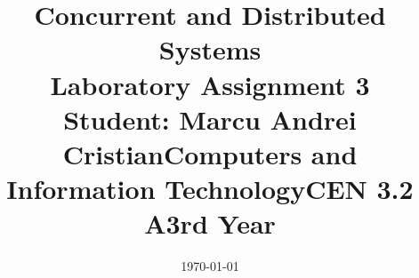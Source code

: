 \documentclass[14pt]{article}
\begin{document}
\title{%
  \huge Concurrent and Distributed Systems \\
  \vspace{20mm}
  \large Laboratory Assignment 3 \\}

\date{\today}
\maketitle
\begin{center}
\vspace{30 mm}

\title{\huge Student: Marcu Andrei Cristian}
\\\vspace{10 mm}
\title{\huge Computers and Information Technology}
\\\vspace{10 mm}
\title{\huge CEN 3.2 A}
\\\vspace{10 mm}
\title{\huge 3rd Year}
\end{center}
\date{}
\maketitle

\newpage
\end{document}
